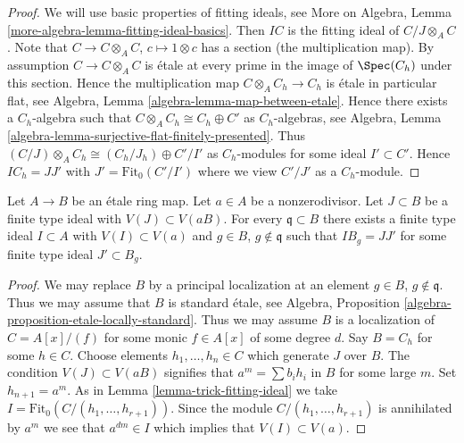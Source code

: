 \begin{proof}
We will use basic properties of fitting ideals, see
More on Algebra, Lemma \ref{more-algebra-lemma-fitting-ideal-basics}.
Then $IC$ is the fitting ideal of $C/J \otimes_A C$.
Note that $C \to C \otimes_A C$, $c \mapsto 1 \otimes c$ has a section
(the multiplication map). By assumption $C \to C \otimes_A C$ is \'etale
at every prime in the image of $\Spec(C_h)$ under this section.
Hence the multiplication map $C \otimes_A C_h \to C_h$ is \'etale
in particular flat, see Algebra, Lemma \ref{algebra-lemma-map-between-etale}.
Hence there exists a $C_h$-algebra such that
$C \otimes_A C_h \cong C_h \oplus C'$ as $C_h$-algebras, see
Algebra, Lemma \ref{algebra-lemma-surjective-flat-finitely-presented}.
Thus $(C/J) \otimes_A C_h \cong (C_h/J_h) \oplus C'/I'$ as
$C_h$-modules for some ideal $I' \subset C'$.
Hence $IC_h = JJ'$ with $J' = \text{Fit}_0(C'/I')$ where we view
$C'/J'$ as a $C_h$-module.
\end{proof}

\begin{lemma}
\label{lemma-push-ideal}
Let $A \to B$ be an \'etale ring map. Let $a \in A$ be a nonzerodivisor.
Let $J \subset B$ be a finite type ideal with $V(J) \subset V(aB)$.
For every $\mathfrak q \subset B$ there exists a finite type ideal
$I \subset A$ with $V(I) \subset V(a)$ and
$g \in B$, $g \not \in \mathfrak q$ such that
$IB_g = JJ'$ for some finite type ideal $J' \subset B_g$.
\end{lemma}

\begin{proof}
We may replace $B$ by a principal localization at
an element $g \in B$, $g \not \in \mathfrak q$. Thus we may assume
that $B$ is standard \'etale, see
Algebra, Proposition \ref{algebra-proposition-etale-locally-standard}.
Thus we may assume $B$ is a localization
of $C = A[x]/(f)$ for some monic $f \in A[x]$ of some degree $d$.
Say $B = C_h$ for some $h \in C$. Choose elements $h_1, \ldots, h_n \in C$
which generate $J$
over $B$. The condition $V(J) \subset V(aB)$ signifies that
$a^m = \sum b_i h_i$ in $B$ for some large $m$. Set $h_{n + 1} = a^m$.
As in Lemma \ref{lemma-trick-fitting-ideal} we take
$I = \text{Fit}_0(C/(h_1, \ldots, h_{r + 1}))$.
Since the module $C/(h_1, \ldots, h_{r + 1})$
is annihilated by $a^m$ we see that $a^{dm} \in I$ which implies
that $V(I) \subset V(a)$.
\end{proof}


